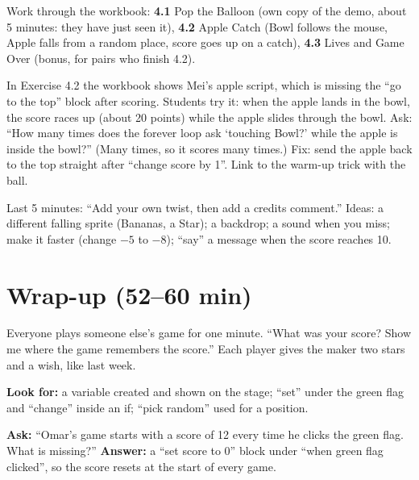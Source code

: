 Work through the workbook: \textbf{4.1} Pop the Balloon (own copy of the demo, about 5 minutes: they have just seen it), \textbf{4.2} Apple Catch (Bowl follows the mouse, Apple falls from a random place, score goes up on a catch), \textbf{4.3} Lives and Game Over (bonus, for pairs who finish 4.2).

\begin{bughunt}
In Exercise 4.2 the workbook shows Mei's apple script, which is missing the \enquote{go to the top} block after scoring. Students try it: when the apple lands in the bowl, the score races up (about 20 points) while the apple slides through the bowl. Ask: \enquote{How many times does the forever loop ask \enquote{touching Bowl?} while the apple is inside the bowl?} (Many times, so it scores many times.) Fix: send the apple back to the top straight after \enquote{change score by 1}. Link to the warm-up trick with the ball.
\end{bughunt}

\begin{freebuild}
Last 5 minutes: \enquote{Add your own twist, then add a credits comment.} Ideas: a different falling sprite (Bananas, a Star); a backdrop; a sound when you miss; make it faster (change $-5$ to $-8$); \enquote{say} a message when the score reaches 10.
\end{freebuild}

\section{Wrap-up (52--60 min)}
\begin{teacherscript}
Everyone plays someone else's game for one minute. \enquote{What was your score? Show me where the game remembers the score.} Each player gives the maker two stars and a wish, like last week.
\end{teacherscript}

\begin{formativecheck}
\textbf{Look for:} a variable created and shown on the stage; \enquote{set} under the green flag and \enquote{change} inside an if; \enquote{pick random} used for a position.

\textbf{Ask:} \enquote{Omar's game starts with a score of 12 every time he clicks the green flag. What is missing?}
\textbf{Answer:} a \enquote{set score to 0} block under \enquote{when green flag clicked}, so the score resets at the start of every game.
\end{formativecheck}

